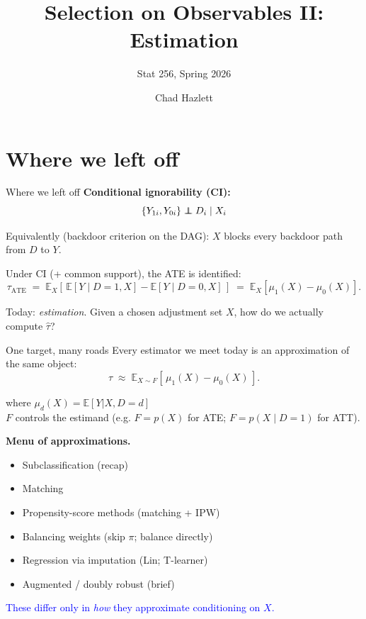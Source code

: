 \documentclass[xcolor=dvipsnames]{beamer}
\title[SOO II]{Selection on Observables II: Estimation}
\subtitle[ ]{Stat 256, Spring 2026}
\author[Hazlett]{Chad Hazlett}
\institute[UCLA]{UCLA\\[1ex]
  \texttt{chazlett@ucla.edu}
}
\date{}
\newcommand\E{\mathbb{E}}
\newcommand\indep{\protect\mathpalette{\protect\independenT}{\perp}}
\def\independenT#1#2{\mathrel{\rlap{$#1#2$}\mkern2mu{#1#2}}}
\begin{document}
\begin{frame}
  \titlepage
\end{frame}


\section{Where we left off}

\begin{frame}{Where we left off}
\small
{} \textbf{Conditional ignorability (CI):}
$$\{Y_{1i}, Y_{0i}\} \indep D_i \mid X_i$$

\medskip
{} Equivalently (backdoor criterion on the DAG): $X$ blocks every backdoor path from $D$ to $Y$.

\medskip
{} Under CI (+ common support), the ATE is identified:
$$\tau_{\text{ATE}} \;=\; \E_X\!\left[\,\E[Y \mid D{=}1, X] - \E[Y \mid D{=}0, X]\,\right] \;=\; \E_X[\mu_1(X) - \mu_0(X)].$$

\bigskip
{} Today: \textit{estimation}. Given a chosen adjustment set $X$, how do we actually compute $\widehat{\tau}$?
\end{frame}


\begin{frame}{One target, many roads}
\footnotesize
{} Every estimator we meet today is an approximation of the same object:
$$\widehat{\tau} \;\approx\; \E_{X \sim F}\!\left[\,\mu_1(X) - \mu_0(X)\,\right].$$

 where $\mu_d(X)=\E[Y|X,D=d]$ \\
 $F$ controls the estimand (e.g. $F=p(X)$ for ATE; $F=p(X\mid D{=}1)$ for ATT).

\medskip
{} \textbf{Menu of approximations.}
\begin{itemize}\itemsep2pt
\item<4-> Subclassification (recap)
\item<5-> Matching
\item<6-> Propensity-score methods (matching + IPW)
\item<7-> Balancing weights (skip $\pi$; balance directly)
\item<8-> Regression via imputation (Lin; T-learner)
\item<9-> Augmented / doubly robust (brief)
\end{itemize}

\medskip
{} \textcolor{Blue}{These differ only in \textit{how} they approximate conditioning on $X$.}
\end{frame}
\end{document}
